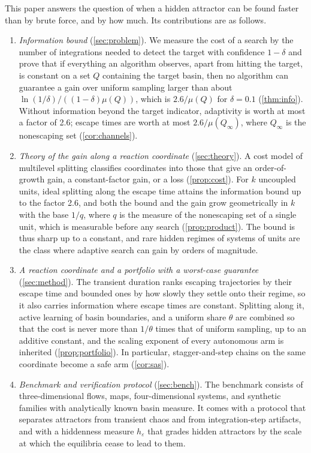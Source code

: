 This paper answers the question of when a hidden attractor can be found faster than by brute force, and by how much. Its contributions are as follows.
\begin{enumerate}
\item \emph{Information bound} (\cref{sec:problem}). We measure the cost of a search by the number of integrations needed to detect the target with confidence $1-\delta$ and prove that if everything an algorithm observes, apart from hitting the target, is constant on a set $Q$ containing the target basin, then no algorithm can guarantee a gain over uniform sampling larger than about $\ln(1/\delta)/((1-\delta)\mu(Q))$, which is $2.6/\mu(Q)$ for $\delta=0.1$ (\cref{thm:info}). Without information beyond the target indicator, adaptivity is worth at most a factor of 2.6; escape times are worth at most $2.6/\mu(Q_\infty)$, where $Q_\infty$ is the nonescaping set (\cref{cor:channels}).
\item \emph{Theory of the gain along a reaction coordinate} (\cref{sec:theory}). A cost model of multilevel splitting classifies coordinates into those that give an order-of-growth gain, a constant-factor gain, or a loss (\cref{prop:cost}). For $k$ uncoupled units, ideal splitting along the escape time attains the information bound up to the factor 2.6, and both the bound and the gain grow geometrically in $k$ with the base $1/q$, where $q$ is the measure of the nonescaping set of a single unit, which is measurable before any search (\cref{prop:product}). The bound is thus sharp up to a constant, and rare hidden regimes of systems of units are the class where adaptive search can gain by orders of magnitude.
\item \emph{A reaction coordinate and a portfolio with a worst-case guarantee} (\cref{sec:method}). The transient duration ranks escaping trajectories by their escape time and bounded ones by how slowly they settle onto their regime, so it also carries information where escape times are constant. Splitting along it, active learning of basin boundaries, and a uniform share $\theta$ are combined so that the cost is never more than $1/\theta$ times that of uniform sampling, up to an additive constant, and the scaling exponent of every autonomous arm is inherited (\cref{prop:portfolio}). In particular, stagger-and-step chains on the same coordinate become a safe arm (\cref{cor:sas}).
\item \emph{Benchmark and verification protocol} (\cref{sec:bench}). The benchmark consists of three-dimensional flows, maps, four-dimensional systems, and synthetic families with analytically known basin measure. It comes with a protocol that separates attractors from transient chaos and from integration-step artifacts, and with a hiddenness measure $h_\varepsilon$ that grades hidden attractors by the scale at which the equilibria cease to lead to them.

\end{enumerate}
